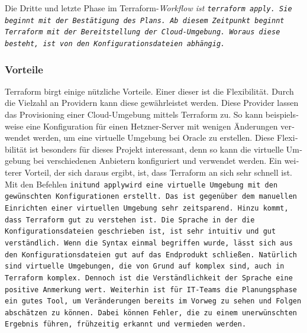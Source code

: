 \begin{otherlanguage}{ngerman}
Die Dritte und letzte Phase im Terraform-\it Workflow \rm ist \tt terraform apply\rm. Sie beginnt mit der Bestätigung des Plans. Ab diesem Zeitpunkt beginnt Terraform mit der Bereitstellung der Cloud-Umgebung. Woraus diese besteht, ist von den Konfigurationsdateien abhängig. 

\subsubsection{Vorteile}
Terraform birgt einige nützliche Vorteile. Einer dieser ist die Flexibilität. Durch die Vielzahl an Providern kann diese gewährleistet werden. Diese Provider lassen das Provisioning einer Cloud-Umgebung mittels Terraform zu. So kann beispielsweise eine Konfiguration für einen Hetzner-Server mit wenigen Änderungen verwendet werden, um eine virtuelle Umgebung bei \dq Oracle \dq{} zu erstellen. Diese Flexibilität ist besonders für dieses Projekt interessant, denn so kann die virtuelle Umgebung bei verschiedenen Anbietern konfiguriert und verwendet werden. 
\newline 
Ein weiterer Vorteil, der sich daraus ergibt, ist, dass Terraform an sich sehr schnell ist. Mit den Befehlen \tt init\rm und \tt apply\rm wird eine virtuelle Umgebung mit den gewünschten Konfigurationen erstellt. Das ist gegenüber dem manuellen Einrichten einer virtuellen Umgebung sehr zeitsparend. 
\newline
Hinzu kommt, dass Terraform gut zu verstehen ist. Die Sprache in der die Konfigurationsdateien geschrieben ist, ist sehr intuitiv und gut verständlich. Wenn die Syntax einmal begriffen wurde, lässt sich aus den Konfigurationsdateien gut auf das Endprodukt schließen. Natürlich sind virtuelle Umgebungen, die von Grund auf komplex sind, auch in Terraform komplex. Dennoch ist die Verständlichkeit der Sprache eine positive Anmerkung wert.
\newline
Weiterhin ist für IT-Teams die Planungsphase ein gutes Tool, um Veränderungen bereits im Vorweg zu sehen und Folgen abschätzen zu können. Dabei können Fehler, die zu einem unerwünschten Ergebnis führen, frühzeitig erkannt und vermieden werden.
\end{otherlanguage}